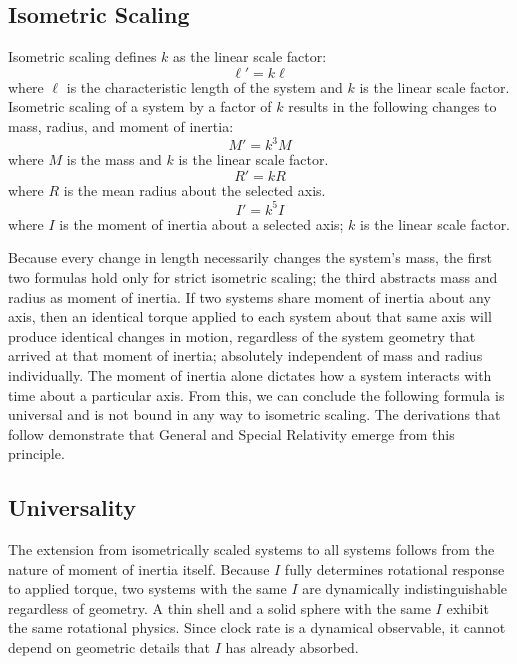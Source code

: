 \documentclass[a4paper,11pt]{article}
\begin{document}
\subsection{Isometric Scaling}
Isometric scaling defines $k$ as the linear scale factor:
\begin{equation}
\ell' = k\ell
\end{equation}
where $\ell$ is the characteristic length of the system and $k$ is the linear scale factor. Isometric scaling of a system by a factor of $k$ results in the following changes to mass, radius, and moment of inertia:
\begin{equation}
M' = k^3 M
\end{equation}
where $M$ is the mass and $k$ is the linear scale factor.
\begin{equation}
R' = kR
\end{equation}
where $R$ is the mean radius about the selected axis.
\begin{equation} \label{eq:inertia_scaling}
I' = k^5 I
\end{equation}
where $I$ is the moment of inertia about a selected axis; $k$ is the linear scale factor.

Because every change in length necessarily changes the system's mass, the first two formulas hold only for strict isometric scaling; the third abstracts mass and radius as moment of inertia. If two systems share moment of inertia about any axis, then an identical torque applied to each system about that same axis will produce identical changes in motion, regardless of the system geometry that arrived at that moment of inertia; absolutely independent of mass and radius individually. The moment of inertia alone dictates how a system interacts with time about a particular axis. From this, we can conclude the following formula is universal and is not bound in any way to isometric scaling. The derivations that follow demonstrate that General and Special Relativity emerge from this principle.

\subsection{Universality}
The extension from isometrically scaled systems to all systems follows from the nature of moment of inertia itself. Because $I$ fully determines rotational response to applied torque, two systems with the same $I$ are dynamically indistinguishable regardless of geometry. A thin shell and a solid sphere with the same $I$ exhibit the same rotational physics. Since clock rate is a dynamical observable, it cannot depend on geometric details that $I$ has already absorbed.
\end{document}
